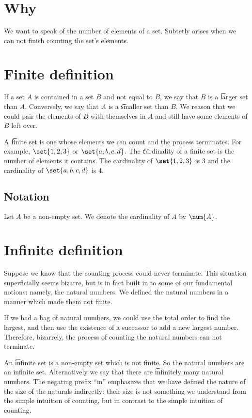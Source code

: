 

\section*{Why}

We want to speak of the number of elements of a set.
Subtetly arises when we can not finish counting the set's elements.

\section*{Finite definition}

If a set $A$ is contained in a set $B$ and not equal to $B$,
we say that $B$ is a \t{larger set} than $A$.
Conversely, we say that $A$ is a \t{smaller set} than $B$.
We reason that we could pair the elements of $B$ with themselves
in $A$ and still have some elements of $B$ left over.

A \t{finite set} is one whose elements we can count and the process terminates.
For example, $\set{1, 2, 3}$ or $\set{a,b,c,d}$.
The \t{cardinality} of a finite set is the number of elements it contains.
The cardinality of $\set{1, 2, 3}$ is 3 and the cardinality of $\set{a,b,c,d}$ is 4.

\subsection*{Notation}

Let $A$ be a non-empty set.
We denote the cardinality of $A$ by $\num{A}$.

\section*{Infinite definition}

Suppose we know that the counting process could never terminate.
This situation superficially seems bizarre, but is in fact built in to some of our fundamental notions: namely, the natural numbers.
We defined the natural numbers in a manner which made them not finite.

If we had a bag of natural numbers, we could use the total order
to find the largest, and then use the existence of a successor to
add a new largest number.
Therefore, bizarrely, the process of counting the natural numbers
can not terminate.

An \t{infinite set} is a non-empty set which is not finite.
So the natural numbers are an infinite set.
Alternatively we say that there are \t{infinitely many} natural numbers.
The negating prefix ``in'' emphasizes that we have defined
the nature of the size of the naturals indirectly: their size
is not something we understand from the simple intuition of
counting, but in contrast to the simple intuition of counting.

